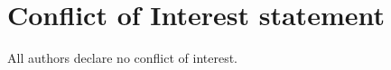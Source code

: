 \documentclass[review]{elsarticle}
\begin{document}








\section*{Conflict of Interest statement}
All authors declare no conflict of interest.
\end{document}
